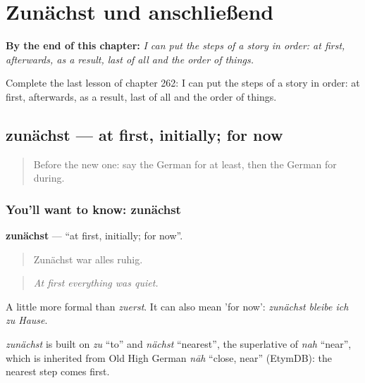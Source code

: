 
\chapter{Zunächst und anschließend}
\label{ch:ge-zunachst-und-anschlie-end}

\begin{chapteropening}
\textbf{By the end of this chapter:} \emph{I can put the steps of a story in order: at first, afterwards, as a result, last of all and the order of things.}

Complete the last lesson of chapter 262: I can put the steps of a story in order: at first, afterwards, as a result, last of all and the order of things.
\end{chapteropening}

\section[zunächst]{zunächst — at first, initially; for now}

\label{lesson:GE-C262-zunaechst}



\begin{quote}
Before the new one: say the German for at least, then the German for during.
\end{quote}

\subsection*{You'll want to know: zunächst}
\textbf{zunächst} — \textquotedblleft{}at first, initially; for now\textquotedblright{}.

\begin{quote}
Zunächst war alles ruhig.
\end{quote}

\begin{quote}
\emph{At first everything was quiet.}
\end{quote}

A little more formal than \emph{zuerst}. It can also mean 'for now': \emph{zunächst bleibe ich zu Hause}.

\begin{cousinweb}
\emph{zunächst} is built on \emph{zu} \textquotedblleft{}to\textquotedblright{} and \emph{nächst} \textquotedblleft{}nearest\textquotedblright{}, the superlative of \emph{nah} \textquotedblleft{}near\textquotedblright{}, which is inherited from Old High German \emph{nāh} \textquotedblleft{}close, near\textquotedblright{} (EtymDB): the nearest step comes first.
\end{cousinweb}

